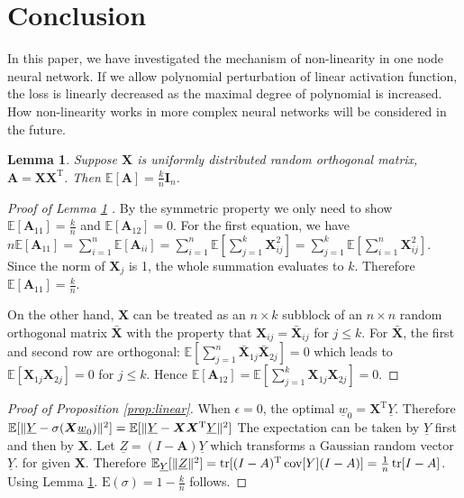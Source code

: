 \documentclass[conference]{IEEEtran}
\newtheorem{lemma}{Lemma}
\DeclarePairedDelimiter\norm{\lVert}{\rVert}
\def\E{\mathbb{E}}
\def\T{\mathrm{T}}
\DeclareMathOperator*{\Tr}{tr}
\DeclareMathOperator*{\Cov}{cov}
\begin{document}
\section{Conclusion}\label{sec:con}

In this paper, we have investigated the mechanism of non-linearity in one node neural network. If we allow polynomial perturbation of linear activation function, the loss is linearly decreased as the maximal degree of polynomial is increased. How non-linearity works in more complex neural networks will be considered in the future. 

\appendix
\begin{lemma}\label{lem:A}
	Suppose $\bm{X}$ is uniformly distributed random orthogonal matrix, $\bm{A} = \bm{X}\bm{X}^\T$.
	Then $\E[\bm{A}] = \frac{k}{n} \mathbf{I}_n$.
\end{lemma}
\begin{proof}[Proof of Lemma \ref{lem:A} ]
By the symmetric property we only need to show $\E[\bm{A}_{11}] = \frac{k}{n}$ and
$\E[\bm{A}_{12}] = 0$. For the first equation, we have $n\E[\bm{A}_{11}]
= \sum_{i=1}^n \E[\bm{A}_{ii}] = \sum_{i=1}^n \E[ \sum_{j=1}^k \bm{X}^2_{ij}] =
\sum_{j=1}^k \E[\sum_{i=1}^n \bm{X}^2_{ij}]$. Since the norm of $\bm{X}_j$ is 1,
the whole summation evaluates to $k$. Therefore $\E[\bm{A}_{11}] = \frac{k}{n}$.

On the other hand, $\bm{X}$ can be treated as an $n\times k$ subblock of an $n\times n$
random orthogonal matrix $\bm{\bar{X}}$ with the property that $\bm{X}_{ij} = \bm{\bar{X}}_{ij}$
for $j\leq k$. For $\bm{\bar{X}}$, the first and second row are orthogonal:
 $\E[\sum_{j=1}^n \bm{\bar{X}}_{1j}\bm{\bar{X}}_{2j}] = 0 $ which leads to
 $\E[\bm{X}_{1j}\bm{X}_{2j}] = 0$ for $j \leq k$. Hence $\E[\bm{A}_{12}]=
 \E[\sum_{j=1}^k \bm{X}_{1j}\bm{X}_{2j}]=0$.
\end{proof}
\begin{proof}[Proof of Proposition \ref{prop:linear}]
    When $\epsilon = 0$, the optimal $\underline{w}_0 = \bm{X}^\T\underline{Y}$. Therefore
    $\E[\norm{\underline{Y} - \sigma(\bm{X} \underline{w}_0)}^2] = \E[\norm{\underline{Y}-\bm{X}\bm{X}^\T\underline{Y}}^2]$
    The expectation can be taken by $\underline{Y}$ first and then by $\bm{X}$.
    Let $\underline{Z} = (I-\bm{A}) \underline{Y}$ which transforms a Gaussian random vector $\underline{Y}$.
    for given $\bm{X}$. Therefore $\E_{\underline{Y}}[\norm{\underline{Z}}^2] = \Tr[(I-A)^\T\Cov[Y](I-A)]
    = \frac{1}{n}\Tr[I - A]$. Using Lemma \ref{lem:A}. $\mathrm{E}(\sigma) = 1 - \frac{k}{n}$ follows.
\end{proof}
\end{document}
